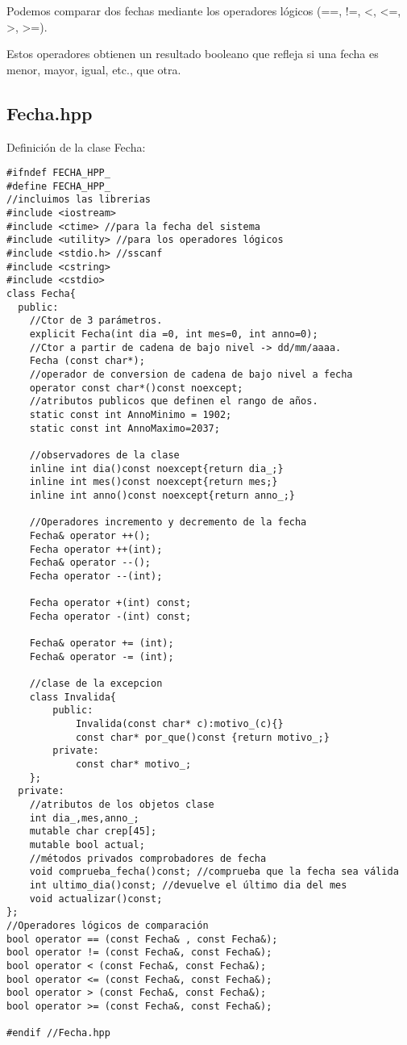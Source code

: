 Podemos comparar dos fechas mediante los operadores lógicos (==, !=, \textless, \textless=, 
\textgreater, \textgreater=).

Estos operadores obtienen un resultado booleano que refleja si una fecha es menor, mayor, igual, etc., que otra.

\subsection{Fecha.hpp}
Definición de la clase Fecha:
\begin{verbatim}
#ifndef FECHA_HPP_
#define FECHA_HPP_
//incluimos las librerias
#include <iostream>
#include <ctime> //para la fecha del sistema
#include <utility> //para los operadores lógicos
#include <stdio.h> //sscanf
#include <cstring>
#include <cstdio>
class Fecha{
  public:
    //Ctor de 3 parámetros.
    explicit Fecha(int dia =0, int mes=0, int anno=0);
    //Ctor a partir de cadena de bajo nivel -> dd/mm/aaaa.
    Fecha (const char*);
    //operador de conversion de cadena de bajo nivel a fecha
    operator const char*()const noexcept;
    //atributos publicos que definen el rango de años.
    static const int AnnoMinimo = 1902;
    static const int AnnoMaximo=2037;

    //observadores de la clase
    inline int dia()const noexcept{return dia_;}
    inline int mes()const noexcept{return mes;}
    inline int anno()const noexcept{return anno_;}

    //Operadores incremento y decremento de la fecha
    Fecha& operator ++();
    Fecha operator ++(int);
    Fecha& operator --();
    Fecha operator --(int);

    Fecha operator +(int) const;
    Fecha operator -(int) const;

    Fecha& operator += (int);
    Fecha& operator -= (int);

    //clase de la excepcion
    class Invalida{
        public:
            Invalida(const char* c):motivo_(c){}
            const char* por_que()const {return motivo_;}
        private:
            const char* motivo_;
    };
  private:
    //atributos de los objetos clase
    int dia_,mes,anno_;
    mutable char crep[45];
    mutable bool actual;
    //métodos privados comprobadores de fecha
    void comprueba_fecha()const; //comprueba que la fecha sea válida
    int ultimo_dia()const; //devuelve el último dia del mes
    void actualizar()const;
};
//Operadores lógicos de comparación
bool operator == (const Fecha& , const Fecha&);
bool operator != (const Fecha&, const Fecha&);
bool operator < (const Fecha&, const Fecha&);
bool operator <= (const Fecha&, const Fecha&);
bool operator > (const Fecha&, const Fecha&);
bool operator >= (const Fecha&, const Fecha&);

#endif //Fecha.hpp
\end{verbatim}
